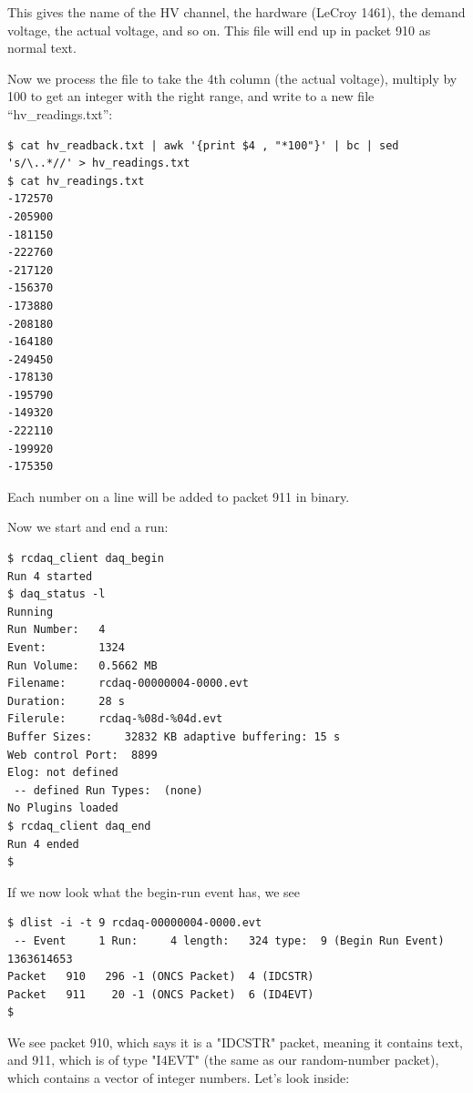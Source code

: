 \documentclass{article}[11pt]
\begin{document}
This gives the name of the HV channel, the hardware (LeCroy 1461), the
demand voltage, the actual voltage, and so on. This file will end up
in packet 910 as normal text.

Now we process the file to take the 4th column (the actual voltage),
multiply by 100 to get an integer with the right range, and write to a
new file ``hv\_readings.txt'':

\begin{verbatim}
$ cat hv_readback.txt | awk '{print $4 , "*100"}' | bc | sed 's/\..*//' > hv_readings.txt
$ cat hv_readings.txt
-172570
-205900
-181150
-222760
-217120
-156370
-173880
-208180
-164180
-249450
-178130
-195790
-149320
-222110
-199920
-175350
\end{verbatim}

Each number on a line will be added to packet 911 in binary. 

Now we start and end a run:

\begin{verbatim}
$ rcdaq_client daq_begin
Run 4 started
$ daq_status -l
Running
Run Number:   4
Event:        1324
Run Volume:   0.5662 MB
Filename:     rcdaq-00000004-0000.evt
Duration:     28 s
Filerule:     rcdaq-%08d-%04d.evt
Buffer Sizes:     32832 KB adaptive buffering: 15 s
Web control Port:  8899
Elog: not defined
 -- defined Run Types:  (none)
No Plugins loaded
$ rcdaq_client daq_end
Run 4 ended
$ 
\end{verbatim}

If we now look what the begin-run event has, we see

\begin{verbatim}
$ dlist -i -t 9 rcdaq-00000004-0000.evt
 -- Event     1 Run:     4 length:   324 type:  9 (Begin Run Event)  1363614653
Packet   910   296 -1 (ONCS Packet)  4 (IDCSTR)
Packet   911    20 -1 (ONCS Packet)  6 (ID4EVT)
$
\end{verbatim}

We see packet 910, which says it is a "IDCSTR" packet, meaning it
contains text, and 911, which is of type "I4EVT" (the same as our
random-number packet), which contains a vector of integer
numbers. Let's look inside:
\end{document}

